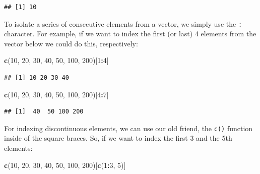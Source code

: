 \documentclass[]{book}
\newenvironment{Shaded}{\begin{snugshade}}{\end{snugshade}}
\newcommand{\DecValTok}[1]{\textcolor[rgb]{0.00,0.00,0.81}{#1}}
\newcommand{\KeywordTok}[1]{\textcolor[rgb]{0.13,0.29,0.53}{\textbf{#1}}}
\newcommand{\NormalTok}[1]{#1}
\newcommand{\OperatorTok}[1]{\textcolor[rgb]{0.81,0.36,0.00}{\textbf{#1}}}
\begin{document}
\begin{verbatim}
## [1] 10
\end{verbatim}

To isolate a series of consecutive elements from a vector, we simply use the \texttt{:} character. For example, if we want to index the first (or last) 4 elements from the vector below we could do this, respectively:

\begin{Shaded}
\begin{Highlighting}[]
\KeywordTok{c}\NormalTok{(}\DecValTok{10}\NormalTok{, }\DecValTok{20}\NormalTok{, }\DecValTok{30}\NormalTok{, }\DecValTok{40}\NormalTok{, }\DecValTok{50}\NormalTok{, }\DecValTok{100}\NormalTok{, }\DecValTok{200}\NormalTok{)[}\DecValTok{1}\OperatorTok{:}\DecValTok{4}\NormalTok{]}
\end{Highlighting}
\end{Shaded}

\begin{verbatim}
## [1] 10 20 30 40
\end{verbatim}

\begin{Shaded}
\begin{Highlighting}[]
\KeywordTok{c}\NormalTok{(}\DecValTok{10}\NormalTok{, }\DecValTok{20}\NormalTok{, }\DecValTok{30}\NormalTok{, }\DecValTok{40}\NormalTok{, }\DecValTok{50}\NormalTok{, }\DecValTok{100}\NormalTok{, }\DecValTok{200}\NormalTok{)[}\DecValTok{4}\OperatorTok{:}\DecValTok{7}\NormalTok{]}
\end{Highlighting}
\end{Shaded}

\begin{verbatim}
## [1]  40  50 100 200
\end{verbatim}

For indexing discontinuous elements, we can use our old friend, the \texttt{c()} function inside of the square braces. So, if we want to index the first 3 and the 5th elements:

\begin{Shaded}
\begin{Highlighting}[]
\KeywordTok{c}\NormalTok{(}\DecValTok{10}\NormalTok{, }\DecValTok{20}\NormalTok{, }\DecValTok{30}\NormalTok{, }\DecValTok{40}\NormalTok{, }\DecValTok{50}\NormalTok{, }\DecValTok{100}\NormalTok{, }\DecValTok{200}\NormalTok{)[}\KeywordTok{c}\NormalTok{(}\DecValTok{1}\OperatorTok{:}\DecValTok{3}\NormalTok{, }\DecValTok{5}\NormalTok{)]}
\end{Highlighting}
\end{Shaded}
\end{document}
